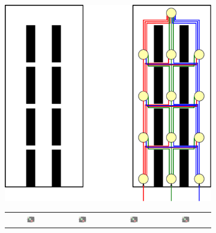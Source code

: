 \begin{figure}
\begin{center}
\begin{subfigure}[b]{0.45\linewidth}
\begin{center}
\includegraphics[width=.65\linewidth]{../fig/aogeometry.pdf}\caption{}\label{fig:nnGeo}
\end{center}
\end{subfigure}
\begin{subfigure}[b]{0.45\linewidth}
\begin{center}
\begin{tabular}{cccc}
{\includegraphics[width=0.2\textwidth,page=1]{../fig/combined.pdf}} 
   & {\includegraphics[width=0.2\textwidth,page=2]{../fig/combined.pdf}}
   & {\includegraphics[width=0.2\textwidth,page=3]{../fig/combined.pdf}} 
   & {\includegraphics[width=0.2\textwidth,page=4]{../fig/combined.pdf}}\\

\end{tabular}
\end{center}
\end{subfigure}
\end{center}
\end{figure}
